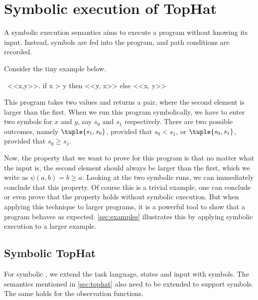 
\section{Symbolic execution of TopHat}
\label{sec:symbolic}

A symbolic execution semantics aims to execute a program without knowing its input.
Instead, symbols are fed into the program, and path conditions are recorded.

Consider the tiny example below.
\begin{TASK}
  \ <<x,y>>. if x > y then <<y, x>> else <<x, y>>
\end{TASK}

This program takes two values and returns a pair, where the second element is larger than the first.
When we run this program symbolically, we have to enter two symbols for $x$ and $y$, say $s_0$ and $s_1$ respectively.
There are two possible outcomes, namely
$\tuple{s_1,s_0}$, provided that $s_0 < s_1$, or
$\tuple{s_0,s_1}$, provided that $s_0 \geq s_1$.

Now, the property that we want to prove for this program is that no matter what the input is, the second element should always be larger than the first, which we write as $\psi(a,b)= b \geq a$.
Looking at the two symbolic runs, we can immediately conclude that this property.
Of course this is a trivial example, one can conclude or even prove that the property holds without symbolic execution.
But when applying this technique to larger programs, it is a powerful tool to show that a program behaves as expected.
\cref{sec:examples} illustrates this by applying symbolic execution to a larger example.


\subsection{Symbolic TopHat}

For symbolic \TOPHAT, we extend the task language, states and input with symbols.
The semantics mentioned in \cref{sec:tophat} also need to be extended to support symbols.
The same holds for the observation functions.


